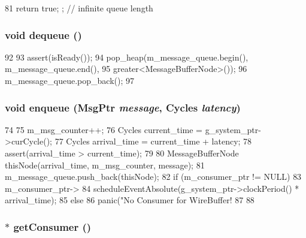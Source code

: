 \begin{DoxyCode}
81 { return true; };  // infinite queue length
\end{DoxyCode}
\hypertarget{classWireBuffer_a851b6644e3e336c07f8e6fe77234b97f}{
\subsubsection[{dequeue}]{\setlength{\rightskip}{0pt plus 5cm}void dequeue ()}}
\label{classWireBuffer_a851b6644e3e336c07f8e6fe77234b97f}



\begin{DoxyCode}
92 {
93     assert(isReady());
94     pop_heap(m_message_queue.begin(), m_message_queue.end(),
95         greater<MessageBufferNode>());
96     m_message_queue.pop_back();
97 }
\end{DoxyCode}
\hypertarget{classWireBuffer_aef2cd392bb1d0b136dc1d901d6e59f13}{
\subsubsection[{enqueue}]{\setlength{\rightskip}{0pt plus 5cm}void enqueue ({\bf MsgPtr} {\em message}, \/  {\bf Cycles} {\em latency})}}
\label{classWireBuffer_aef2cd392bb1d0b136dc1d901d6e59f13}



\begin{DoxyCode}
74 {
75     m_msg_counter++;
76     Cycles current_time = g_system_ptr->curCycle();
77     Cycles arrival_time = current_time + latency;
78     assert(arrival_time > current_time);
79 
80     MessageBufferNode thisNode(arrival_time, m_msg_counter, message);
81     m_message_queue.push_back(thisNode);
82     if (m_consumer_ptr != NULL) {
83         m_consumer_ptr->
84             scheduleEventAbsolute(g_system_ptr->clockPeriod() * arrival_time);
85     } else {
86         panic("No Consumer for WireBuffer! %
87     }
88 }
\end{DoxyCode}
\hypertarget{classWireBuffer_a2417fc7252a612b5c976ceaa2d1be4f7}{
\subsubsection[{getConsumer}]{$\ast$ getConsumer ()}}
\label{classWireBuffer_a2417fc7252a612b5c976ceaa2d1be4f7}



